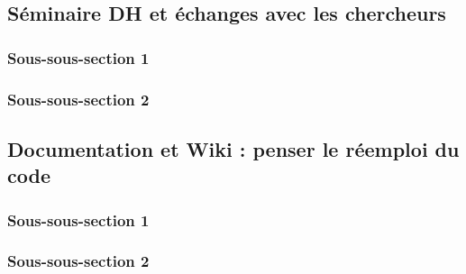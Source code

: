 
\subsection{Séminaire DH et échanges avec les chercheurs}
    \subsubsection{Sous-sous-section 1}

    
    \subsubsection{Sous-sous-section 2}

    
    \subsection{Documentation et Wiki : penser le réemploi du code}
        \subsubsection{Sous-sous-section 1}


        \subsubsection{Sous-sous-section 2}

